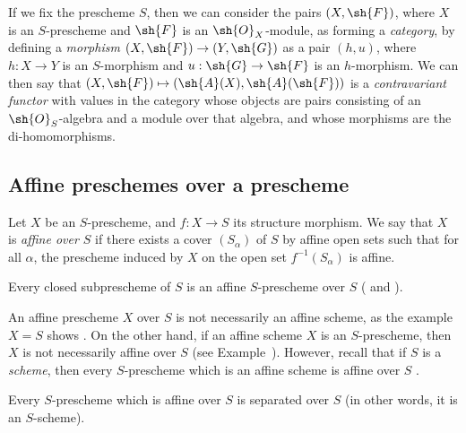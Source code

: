 \begin{env}[1.1.3]
\label{II.1.1.3}
If we fix the prescheme $S$, then we can consider the pairs $(X,\sh{F})$, where $X$ is an $S$-prescheme and $\sh{F}$ is an $\sh{O}_X$-module, as forming a \emph{category}, by defining a \emph{morphism} $(X,\sh{F})\to(Y,\sh{G})$ as a pair $(h,u)$, where $h:X\to Y$ is an $S$-morphism and $u:\sh{G}\to\sh{F}$ is an $h$-morphism.
We can then say that $(X,\sh{F})\mapsto(\sh{A}(X),\sh{A}(\sh{F}))$ is a \emph{contravariant functor} with values in the category whose objects are pairs consisting of an $\sh{O}_S$-algebra and a module over that algebra, and whose morphisms are the di-homomorphisms.
\end{env}

\subsection{Affine preschemes over a prescheme}
\label{subsection:II.1.2}

\begin{definition}[1.2.1]
\label{II.1.2.1}
Let $X$ be an $S$-prescheme, and $f:X\to S$ its structure morphism.
We say that $X$ is \emph{affine over $S$} if there exists a cover $(S_\alpha)$ of $S$ by affine open sets such that for all $\alpha$, the prescheme induced by $X$ on the open set $f^{-1}(S_\alpha)$ is affine.
\end{definition}

\begin{example}[1.2.2]
\label{II.1.2.2}
Every closed subprescheme of $S$ is an affine $S$-prescheme over $S$ ( and ).
\end{example}

\begin{remark}[1.2.3]
\label{II.1.2.3}
An affine prescheme $X$ over $S$ is not necessarily an affine scheme, as the example $X=S$ shows .
On the other hand, if an affine scheme $X$ is an $S$-prescheme, then $X$ is not necessarily affine over
$S$ (see Example~).
However, recall that if $S$ is a \emph{scheme}, then every $S$-prescheme which is an affine scheme is affine over $S$ .
\end{remark}

\begin{proposition}[1.2.4]
\label{II.1.2.4}
Every $S$-prescheme which is affine over $S$ is separated over $S$ (in other words, it is an $S$-scheme).
\end{proposition}

